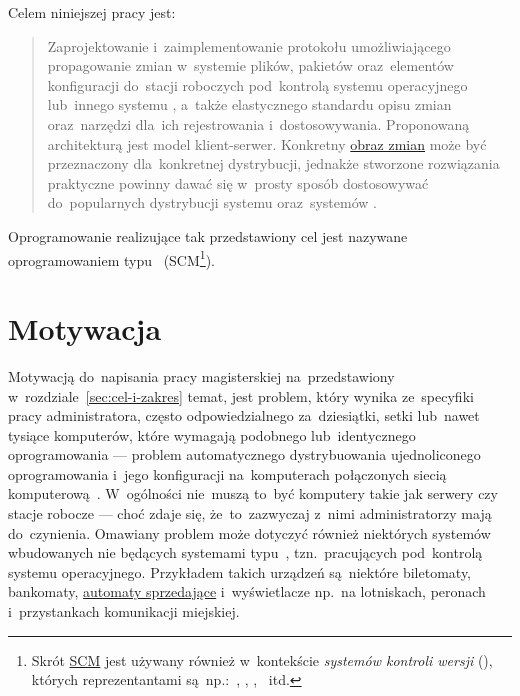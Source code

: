 \documentclass[thesis]{subfiles}
\begin{document}
\noindent Celem niniejszej pracy jest:\mynobreakpar
\blockcquote{formularz-zgloszenia-pracy}{Zaprojektowanie i~zaimplementowanie protokołu umożliwiającego propagowanie zmian w~systemie plików, pakietów oraz~elementów konfiguracji do~stacji roboczych pod~kontrolą systemu operacyjnego  lub~innego systemu , a~także elastycznego standardu opisu zmian oraz~narzędzi dla~ich rejestrowania i~dostosowywania. Proponowaną architekturą jest model klient-serwer. Konkretny \hyperref[sec:obraz-zmian-konfiguracji]{obraz zmian} może być przeznaczony dla~konkretnej dystrybucji, jednakże stworzone rozwiązania praktyczne powinny dawać się w~prosty sposób dostosowywać do~popularnych dystrybucji systemu  oraz~systemów .}\mynobreakpar
Oprogramowanie realizujące tak przedstawiony cel jest nazywane oprogramowaniem typu ~(SCM\footnote{Skrót \href{https://en.wikipedia.org/wiki/SCM}{SCM} jest używany również w~kontekście \emph{systemów kontroli wersji} (), których reprezentantami są~np.:~, , , ~itd.}).


\section{Motywacja}

Motywacją do~napisania pracy magisterskiej na~przedstawiony w~rozdziale~\ref{sec:cel-i-zakres} temat, jest problem, który wynika ze~specyfiki pracy administratora, często odpowiedzialnego za~dziesiątki, setki lub~nawet tysiące komputerów, które wymagają podobnego lub~identycznego oprogramowania --- problem automatycznego dystrybuowania ujednoliconego oprogramowania i~jego konfiguracji na~komputerach połączonych siecią komputerową~\cite{so-problem-intro}. W~ogólności nie~muszą to~być komputery takie jak serwery czy stacje robocze --- choć zdaje się, że~to~zazwyczaj z~nimi administratorzy mają do~czynienia. Omawiany problem może dotyczyć również niektórych systemów wbudowanych nie będących systemami typu~\mbox{}, tzn.~pracujących pod~kontrolą systemu operacyjnego. Przykładem takich urządzeń są~niektóre biletomaty, bankomaty, \href{https://en.wikipedia.org/wiki/Vending_machine}{automaty sprzedające} i~wyświetlacze np.~na lotniskach, peronach i~przystankach komunikacji miejskiej.
\end{document}
